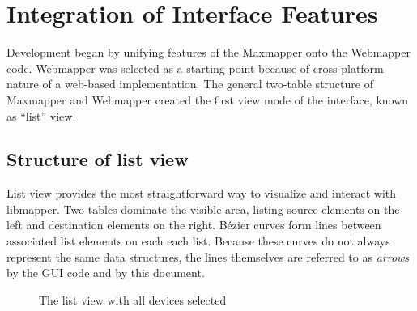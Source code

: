 
\section{Integration of Interface Features} %
\label{sec:integration_of_interface_features}

Development began by unifying features of the Maxmapper onto the Webmapper code. Webmapper was selected as a starting point because of cross-platform nature of a web-based implementation. The general two-table structure of Maxmapper and Webmapper created the first view mode of the interface, known as ``list'' view.

	\subsection{Structure of list view} %
	\label{sub:the_list_view}

List view provides the most straightforward way to visualize and interact with libmapper. Two tables dominate the visible area, listing source elements on the left and destination elements on the right. B\'ezier curves form lines between associated list elements on each each list. Because these curves do not always represent the same data structures, the lines themselves are referred to as \emph{arrows} by the GUI code and by this document.

\begin{figure}[ht]
\centering
\caption{The list view with all devices selected}
\label{fig:list_view_all_devices}
\end{figure}

